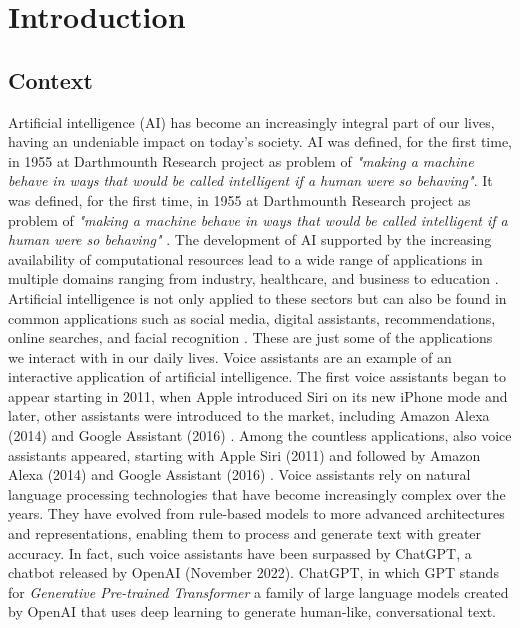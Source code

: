 \chapter{Introduction}
\section{Context}
Artificial intelligence (AI) has become an increasingly integral part of our lives, having an undeniable impact on today’s society. AI was defined, for the first time, in 1955 at Darthmounth Research project as problem of \textit{"making a machine behave in ways that would be called intelligent if a human were so behaving"}\cite{kaplan2019siri}. 
It was defined, for the first time, in 1955 at Darthmounth Research project as problem of \textit{"making a machine behave in ways that would be called intelligent if a human were so behaving"} \cite{kaplan2019siri}. The development of AI supported by the increasing availability of computational resources lead to a wide range of applications in multiple domains ranging from industry, healthcare, and business to education \cite{busnatu2022clinical}.  Artificial intelligence is not only applied to these sectors but can also be found in common applications such as social media, digital assistants, recommendations, online searches, and facial recognition \cite{ref1}. These are just some of the applications we interact with in our daily lives. Voice assistants are an example of an interactive application of artificial intelligence. The first voice assistants began to appear starting in 2011, when Apple introduced Siri on its new iPhone mode and later, other assistants were introduced to the market, including Amazon Alexa (2014) and Google Assistant (2016) \cite{ref2}.
Among the countless applications, also voice assistants appeared, starting with Apple Siri (2011) and followed by Amazon Alexa (2014) and Google Assistant (2016) \cite{ref2}. Voice assistants rely on natural language processing technologies that have become increasingly complex over the years. They have evolved from rule-based models to more advanced architectures and representations, enabling them to process and generate text with greater accuracy. In fact, such voice assistants have been surpassed by ChatGPT, a chatbot released by OpenAI (November 2022). ChatGPT, in which GPT stands for \textit{Generative Pre-trained Transformer} a family of large language models created by OpenAI that uses deep learning to generate human-like, conversational text.
